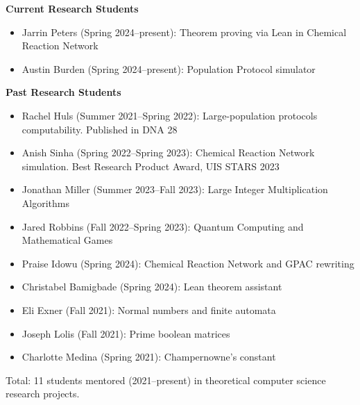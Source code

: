 \documentclass[10pt]{article}
\newenvironment{innerlist}[1][\enskip\textbullet]%
        {\begin{itemize}[#1,leftmargin=*,parsep=0pt,itemsep=0pt,topsep=0pt,partopsep=0pt]}
        {\end{itemize}}
\begin{document}
\textbf{Current Research Students}
\begin{innerlist}
\item Jarrin Peters (Spring 2024--present): Theorem proving via Lean in Chemical Reaction Network
\item Austin Burden (Spring 2024--present): Population Protocol simulator
\end{innerlist}

\textbf{Past Research Students}
\begin{innerlist}
\item Rachel Huls (Summer 2021--Spring 2022): Large-population protocols computability. Published in DNA 28
\item Anish Sinha (Spring 2022--Spring 2023): Chemical Reaction Network simulation. Best Research Product Award, UIS STARS 2023
\item Jonathan Miller (Summer 2023--Fall 2023): Large Integer Multiplication Algorithms
\item Jared Robbins (Fall 2022--Spring 2023): Quantum Computing and Mathematical Games
\item Praise Idowu (Spring 2024): Chemical Reaction Network and GPAC rewriting
\item Christabel Bamigbade (Spring 2024): Lean theorem assistant
\item Eli Exner (Fall 2021): Normal numbers and finite automata
\item Joseph Lolis (Fall 2021): Prime boolean matrices
\item Charlotte Medina (Spring 2021): Champernowne's constant
\end{innerlist}

Total: 11 students mentored (2021--present) in theoretical computer science research projects.
\end{document}
